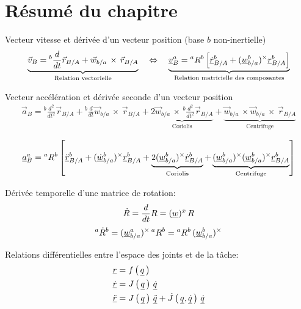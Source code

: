 \newpage
\section{Résumé du chapitre}


Vecteur vitesse et dérivée d'un vecteur position (base $b$ non-inertielle)
\begin{align}
\underbrace{
\vec{v}_{B} = {}^{b}\frac{d}{dt} \vec{r}_{B/A} +  \vec{w}_{b/a} \, \times \, \vec{r}_{B/A}
}_{\text{Relation vectorielle}}
\quad \Leftrightarrow \quad 
\underbrace{
\underline{v}_{B}^{a} = {}^{a}R^b \left[ \underline{\dot{r}}^b_{B/A} +  (\underline{w}_{b/a}^b)^{\times} \underline{r}^b_{B/A}  \right] 
}_{\text{Relation matricielle des composantes}}
\end{align}

Vecteur accélération et dérivée seconde d'un vecteur position
\begin{align}
\vec{a}_{B} = 
{}^{b}\frac{d^2}{dt^2} \vec{r}_{B/A} 
+  
{}^{b}\frac{d}{dt} \vec{w}_{b/a} \, \times \, \vec{r}_{B/A}
+
\underbrace{
2 \vec{w}_{b/a} \, \times \, {}^{b}\frac{d^2}{dt^2} \vec{r}_{B/A}
}_{\text{Coriolis}}
+
\underbrace{
\vec{w}_{b/a} \, \times \vec{w}_{b/a} \, \times \,
\vec{r}_{B/A}
}_{\text{Centrifuge}}
\end{align}

\begin{align}
\underline{a}_{B}^{a} 
= 
{}^{a}R^b \left[ 
\underline{\ddot{r}}^b_{B/A}
+ 
(\underline{\dot{w}}_{b/a}^b)^{\times} \underline{r}^b_{B/A}  
+
\underbrace{
2 (\underline{w}_{b/a}^b)^{\times} \underline{\dot{r}}^b_{B/A}  
}_{\text{Coriolis}}
+
\underbrace{
(\underline{w}_{b/a}^b)^{\times} (\underline{w}_{b/a}^b)^{\times} \underline{r}^b_{B/A}  
}_{\text{Centrifuge}}
\right] 
\end{align}

Dérivée temporelle d'une matrice de rotation:
\begin{equation}
\dot{R} = \frac{d}{dt} R = (\underline{w})^x \, R
\end{equation}
\begin{equation}
{}^{a}\dot{R}^b =  (\underline{w}_{b/a}^a)^{\times} \, {}^{a}R^b =   {}^{a}R^b \, (\underline{w}_{b/a}^b)^{\times}
\end{equation}

Relations différentielles entre l'espace des joints et de la tâche:
\begin{align}
\underline{r} &= f\left( \, \underline{q} \, \right) \\
\underline{\dot{r}} &= J\left( \, \underline{q} \, \right) \, \underline{\dot{q}} \\
\underline{\ddot{r}} &= J\left( \, \underline{q} \, \right) \, \underline{\ddot{q}}  + \dot{J} \left( \, \underline{q}  , \underline{\dot{q}} \, \right) \, \underline{\dot{q}} 
\end{align}


